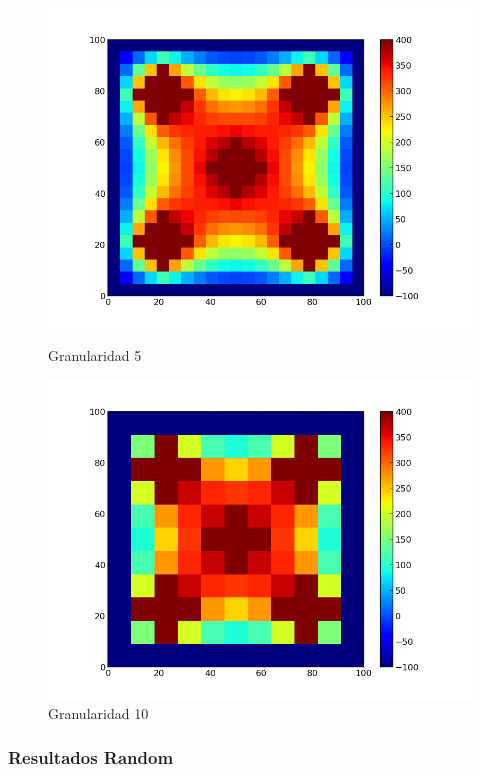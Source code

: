 \begin{figure}[!htb]
\begin{center}
    \includegraphics[scale=0.3]{imagenes/test5_gran5.png}
                \caption{Granularidad 5}
 \end{center}
\endminipage
{}
\begin{center}
   \includegraphics[scale=0.3]{imagenes/test5_gran10.png}
                \caption{Granularidad 10}
        \end{center}
\endminipage\hfill
\end{figure}
\clearpage

\subsubsection{Resultados Random}

